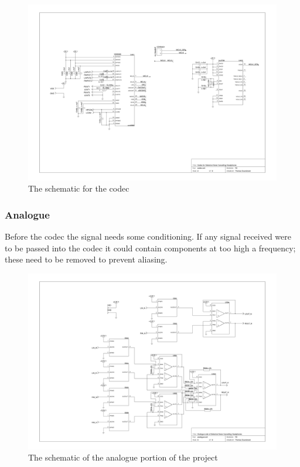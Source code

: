 \begin{figure}[H]
	\centering
	\includegraphics[width=\textwidth]{./img/codec.png}
	\caption{The schematic for the codec}
	\label{fig:codecsch}
\end{figure}

\subsubsection{Analogue}
Before the codec the signal needs some conditioning.
If any signal received were to be passed into the codec it could contain components at too high a frequency; these need to be removed to prevent aliasing.

\begin{figure}[H]
	\centering
	\includegraphics[width=\textwidth]{./img/analogue.png}
	\caption{The schematic of the analogue portion of the project}
	\label{fig:analoguesch}
\end{figure}

